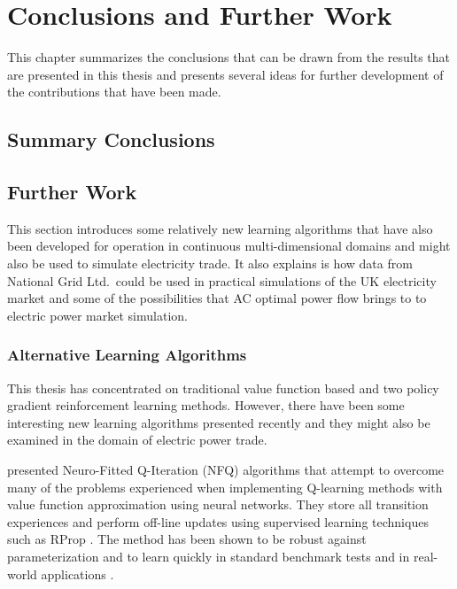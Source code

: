 \chapter{Conclusions and Further Work}
\label{ch:conclusion}
This chapter summarizes the conclusions that can be drawn from the
results that are presented in this thesis and presents several ideas for
further development of the contributions that have been made.

\section{Summary Conclusions}


\section{Further Work}
\label{sec:furtherwork}
This section introduces some relatively new learning algorithms that have
also been developed for operation in continuous multi-dimensional domains and
might also be used to simulate electricity trade.
It also explains is how data from National Grid Ltd.~could be used in practical
simulations of the UK electricity market and some of the possibilities that AC
optimal power flow brings to to electric power market simulation.


\subsection{Alternative Learning Algorithms}
This thesis has concentrated on traditional value function based and two policy
gradient reinforcement learning methods.  However, there have been some
interesting new learning algorithms presented recently and they might also be
examined in the domain of electric power trade.

 presented Neuro-Fitted Q-Iteration (NFQ) algorithms
that attempt to overcome many of the problems experienced when implementing
Q-learning methods with value function approximation using neural networks.
They store all transition experiences and perform off-line updates using
supervised learning techniques such as RProp \cite{riedmiller93}.  The method
has been shown to be robust against parameterization and to learn quickly in
standard benchmark tests and in real-world applications \cite{kietzmann09}.

